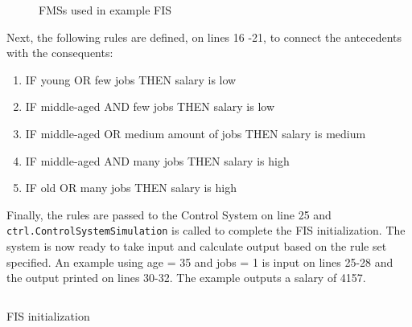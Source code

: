 \begin{figure}[H]
    \caption{FMSs used in example FIS}
    \label{fig:fmf_ex3}
\end{figure}

Next, the following rules are defined, on lines 16 -21, to connect the antecedents with the consequents:

\begin{enumerate}[label=\textbf{Rule \arabic*},ref=Rule \arabic*]
    \item IF young  OR few jobs THEN salary is low
    \item IF middle-aged  AND few jobs THEN salary is low
    \item IF middle-aged  OR medium amount of  jobs THEN salary is medium
    \item IF middle-aged  AND many jobs THEN salary is high
    \item IF old  OR many jobs THEN salary is high
\end{enumerate}

Finally, the rules are passed to the Control System on line 25  and  \\ \texttt{ctrl.ControlSystemSimulation} is called to complete the FIS initialization.
The system is now ready to take input and calculate output based on the rule set specified. An example using age = 35 and jobs = 1 is input on lines 25-28 and the output printed on lines 30-32. The example outputs a salary of 4157.





\begin{listing}[H]
    \inputminted[linenos, breaklines=true,fontsize=\scriptsize, numberblanklines=false]{python}{../src/example.py}
    \caption{FIS initialization}
    \label{listing:fis}
\end{listing}

